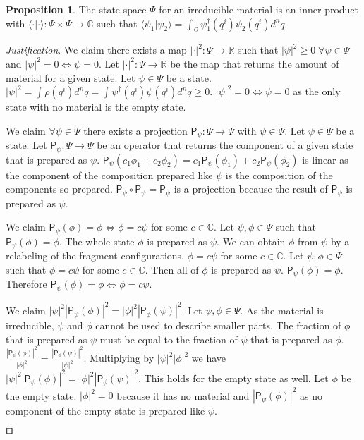\documentclass[smallextended]{svjour3}
\numberwithin{equation}{section}
\newenvironment{justification}{\emph{Justification}.}{\hfill\(\qed\)}
\theoremstyle{definition}
\newtheorem{prop}[equation]{Proposition}
\newenvironment{justification}{\emph{Justification}.}{\qed}
\begin{document}
\begin{prop}\label{prop:inner_product}
	The state space $\Psi$ for an irreducible material is an inner product with $\langle \cdot |\cdot \rangle : \Psi \times \Psi \rightarrow \mathbb{C}$ such that $\langle \psi_1 | \psi_2 \rangle = \int_\mathcal{Q} \psi_1^\dagger (q^i) \psi_2(q^i) d^nq$.
\end{prop}
\begin{justification}
	We claim there exists a map $| \cdot | ^2 : \Psi \rightarrow \mathbb{R}$ such that $|\psi|^2 \ge 0 \; \forall \psi \in \Psi$ and $|\psi|^2 = 0 \Leftrightarrow \psi = 0$. Let $| \cdot | ^2 : \Psi \rightarrow \mathbb{R}$ be the map that returns the amount of material for a given state. Let $\psi \in \Psi$ be a state. $|\psi|^2 = \int \rho(q^i) d^nq = \int \psi^\dagger(q^i) \psi(q^i) d^nq \ge 0$. $|\psi|^2 = 0 \Leftrightarrow \psi = 0$ as the only state with no material is the empty state.
	
	We claim $\forall \psi \in \Psi$ there exists a projection $\mathsf{P}_\psi : \Psi \rightarrow \Psi$ with $\psi \in \Psi$. Let $\psi \in \Psi$ be a state. Let $\mathsf{P}_\psi : \Psi \rightarrow \Psi$ be an operator that returns the component of a given state that is prepared as $\psi$. $\mathsf{P}_{\psi}(c_1 \phi_1 + c_2 \phi_2) = c_1 \mathsf{P}_{\psi}(\phi_1) + c_2 \mathsf{P}_{\psi}(\phi_2)$ is linear as the component of the composition prepared like $\psi$ is the composition of the components so prepared. $\mathsf{P}_\psi \circ \mathsf{P}_\psi = \mathsf{P}_\psi$ is a projection because the result of $\mathsf{P}_\psi$  is prepared as $\psi$. 
	
	We claim $\mathsf{P}_{\psi} (\phi) = \phi \Leftrightarrow \phi = c \psi$ for some $c \in \mathbb{C}$. Let $\psi, \phi \in \Psi$ such that $\mathsf{P}_{\psi} (\phi) = \phi$. The whole state $\phi$ is prepared as $\psi$. We can obtain $\phi$ from $\psi$ by a relabeling of the fragment configurations. $\phi = c \psi$ for some $c \in \mathbb{C}$. Let $\psi, \phi \in \Psi$ such that $\phi = c \psi$ for some $c \in \mathbb{C}$. Then all of $\phi$ is prepared as $\psi$. $\mathsf{P}_{\psi} (\phi) = \phi$. Therefore $\mathsf{P}_{\psi} (\phi) = \phi \Leftrightarrow \phi = c \psi$.
	
	We claim $|\psi|^2|\mathsf{P}_{\psi} (\phi)|^2=|\phi|^2|\mathsf{P}_{\phi} (\psi)|^2$. Let $\psi, \phi \in \Psi$. As the material is irreducible, $\psi$ and $\phi$ cannot be used to describe smaller parts. The fraction of $\phi$ that is prepared as $\psi$ must be equal to the fraction of $\psi$ that is prepared as $\phi$. $\frac{|\mathsf{P}_{\psi} (\phi)|^2}{|\phi|^2}=\frac{|\mathsf{P}_{\phi} (\psi)|^2}{|\psi|^2}$. Multiplying by $|\psi|^2|\phi|^2$ we have $|\psi|^2|\mathsf{P}_{\psi} (\phi)|^2=|\phi|^2|\mathsf{P}_{\phi} (\psi)|^2$. This holds for the empty state as well. Let $\phi$ be the empty state. $|\phi|^2=0$ because it has no material and $|\mathsf{P}_{\psi} (\phi)|^2$ as no component of the empty state is prepared like $\psi$.
	

\end{justification}
\end{document}
